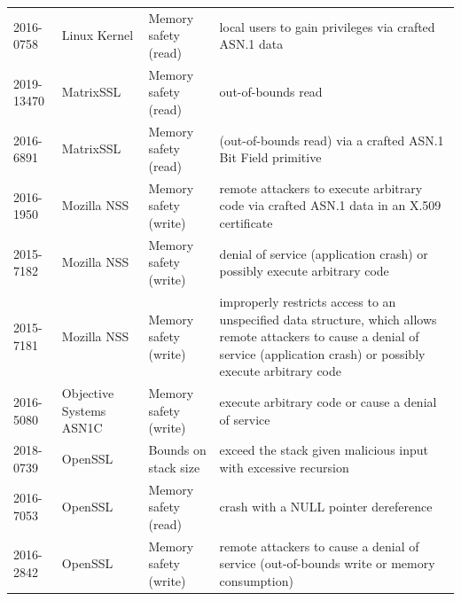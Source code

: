 \documentclass[10p,conference]{IEEEtran}
\begin{document}
\begin{longtable}{ l l l p{26em} }
2016-0758    & Linux Kernel  & Memory safety (read) & local users to gain privileges via crafted ASN.1 data \\ 
2019-13470   & MatrixSSL     & Memory safety (read) & out-of-bounds read \\ 
2016-6891    & MatrixSSL     & Memory safety (read) & (out-of-bounds read) via a crafted ASN.1 Bit Field primitive \\ 
2016-1950    & Mozilla NSS   & Memory safety (write) & remote attackers to execute arbitrary code via crafted ASN.1 data in an X.509 certificate \\ 
2015-7182    & Mozilla NSS   & Memory safety (write) & denial of service (application crash) or possibly execute arbitrary code \\ 
2015-7181    & Mozilla NSS   & Memory safety (write) & improperly restricts access to an unspecified data structure, which allows remote attackers to cause a denial of service (application crash) or possibly execute arbitrary code \\ 
2016-5080    & Objective Systems ASN1C & Memory safety (write) & execute arbitrary code or cause a denial of service \\ 
2018-0739    & OpenSSL       & Bounds on stack size & exceed the stack given malicious input with excessive recursion \\ 
2016-7053    & OpenSSL       & Memory safety (read) & crash with a NULL pointer dereference \\ 
2016-2842    & OpenSSL       & Memory safety (write) & remote attackers to cause a denial of service (out-of-bounds write or memory consumption) \\ 
 

\end{longtable}
\end{document}
